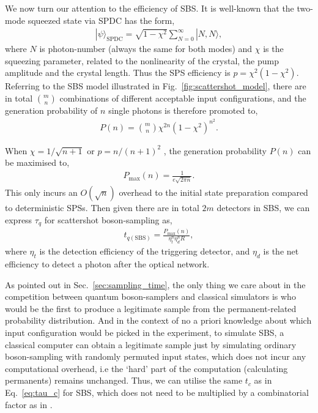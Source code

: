 \documentclass[aps,rmp,twocolumn,amsmath,amssymb,nofootinbib,superscriptaddress]{revtex4}
\newcommand{\ket}[1]{|#1\rangle}
\begin{document}
We now turn our attention to the efficiency of SBS. It is well-known that the two-mode squeezed state via SPDC has the form,
\begin{align}
\ket\psi_\mathrm{SPDC} = \sqrt{1-\chi^2}\sum_{N=0}^\infty \ket{N,N},
\end{align}
where $N$ is photon-number (always the same for both modes) and $\chi$ is the squeezing parameter, related to the nonlinearity of the crystal, the pump amplitude and the crystal length. Thus the SPS efficiency is \mbox{$p=\chi^2(1-\chi^2)$}. Referring to the SBS model illustrated in Fig.~\ref{fig:scattershot_model}, there are in total $\binom{m}{n}$ combinations of different acceptable input configurations, and the generation probability of $n$ single photons is therefore promoted to,
\begin{align}
P(n) = \binom{m}{n} \chi^{2n}(1-\chi^2)^{n^2}.
\end{align}

When \mbox{$\chi=1/\sqrt{n+1}$} or \mbox{$p=n/(n+1)^2$} \cite{bib:36}, the generation probability $P(n)$ can be maximised to,
\begin{align}
P_\mathrm{max}(n) = \frac{1}{e\sqrt{2\pi n}}.
\end{align}
This only incurs an $O(\sqrt{n})$ overhead to the initial state preparation compared to deterministic SPSs. Then given there are in total $2m$ detectors in SBS, we can express $\tau_q$ for scattershot boson-sampling as,
\begin{align}
t_{q(\mathrm{SBS})} = \frac{P_\mathrm{max}(n)}{\eta_t^n\eta_d^n R},
\end{align}
where $\eta_t$ is the detection efficiency of the triggering detector, and $\eta_d$ is the net efficiency to detect a photon after the optical network.

As pointed out in Sec.~\ref{sec:sampling_time}, the only thing we care about in the competition between quantum boson-samplers and classical simulators is who would be the first to produce a legitimate sample from the permanent-related probability distribution. And in the context of no a priori knowledge about which input configuration would be picked in the experiment, to simulate SBS, a classical computer can obtain a legitimate sample just by simulating ordinary boson-sampling with randomly permuted input states, which does not incur any computational overhead, i.e the `hard' part of the computation (calculating permanents) remains unchanged. Thus, we can utilise the same $t_c$ as in Eq.~\ref{eq:tau_c} for SBS, which does not need to be multiplied by a combinatorial factor as in \cite{bib:37}.
\end{document}
